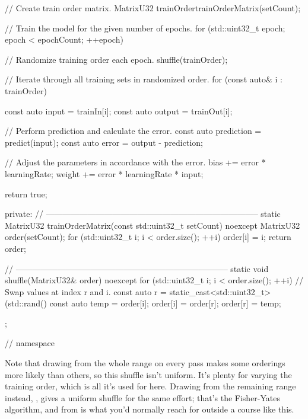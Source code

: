 \begin{cppcode}
{{{        // Create train order matrix.
        MatrixU32 trainOrder{trainOrderMatrix(setCount)};

        // Train the model for the given number of epochs.
        for (std::uint32_t epoch{}; epoch < epochCount; ++epoch)
        {
            // Randomize training order each epoch.
            shuffle(trainOrder);

            // Iterate through all training sets in randomized order.
            for (const auto& i : trainOrder)
            {
                const auto input  = trainIn[i];
                const auto output = trainOut[i];

                // Perform prediction and calculate the error.
                const auto prediction = predict(input);
                const auto error      = output - prediction;

                // Adjust the parameters in accordance with the error.
                bias   += error * learningRate;
                weight += error * learningRate * input;
            }
        }
        return true;
    }

private:
    // -----------------------------------------------------------------------------
    static MatrixU32 trainOrderMatrix(const std::uint32_t setCount) noexcept
    {
        MatrixU32 order(setCount);
        for (std::uint32_t i{}; i < order.size(); ++i) { order[i] = i; }
        return order;
    }

    // -----------------------------------------------------------------------------
    static void shuffle(MatrixU32& order) noexcept
    {
        for (std::uint32_t i{}; i < order.size(); ++i)
        {
            // Swap values at index r and i.
            const auto r    = static_cast<std::uint32_t>(std::rand() %
            const auto temp = order[i];
            order[i]        = order[r];
            order[r]        = temp;
        }
    }
};
} // namespace
\end{cppcode}

Note that drawing  from the whole range on every pass makes some orderings more likely than
others, so this shuffle isn't uniform. It's plenty for varying the training order, which is all
it's used for here. Drawing from the remaining range instead,
, gives a uniform shuffle for the same effort; that's
the Fisher-Yates algorithm, and  from  is what you'd normally
reach for outside a course like this.

